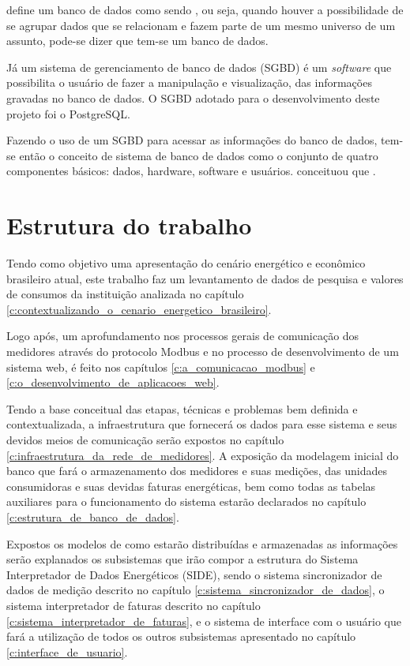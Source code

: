  define um banco de dados como sendo , ou seja, quando houver a possibilidade de se agrupar dados que se relacionam e fazem parte de um mesmo universo de um assunto, pode-se dizer que tem-se um banco de dados.

Já um sistema de gerenciamento de banco de dados (SGBD) é um \textit{software} que possibilita o usuário de fazer a manipulação e visualização, das informações gravadas no banco de dados. O SGBD adotado para o desenvolvimento deste projeto foi o PostgreSQL.

Fazendo o uso de um SGBD para acessar as informações do banco de dados, tem-se então o conceito de sistema de banco de dados como o conjunto de quatro componentes básicos: dados, hardware, software e usuários. \cite{date2004} conceituou que .


\section{Estrutura do trabalho}

Tendo como objetivo uma apresentação do cenário energético e econômico brasileiro atual, este trabalho faz um levantamento de dados de pesquisa e valores de consumos da instituição analizada no capítulo \ref{c:contextualizando_o_cenario_energetico_brasileiro}.

Logo após, um aprofundamento nos processos gerais de comunicação dos medidores através do protocolo Modbus e no processo de desenvolvimento de um sistema web, é feito nos capítulos \ref{c:a_comunicacao_modbus} e \ref{c:o_desenvolvimento_de_aplicacoes_web}.

Tendo a base conceitual das etapas, técnicas e problemas bem definida e contextualizada, a infraestrutura que fornecerá os dados para esse sistema e seus devidos meios de comunicação serão expostos no capítulo \ref{c:infraestrutura_da_rede_de_medidores}.
A exposição da modelagem inicial do banco que fará o armazenamento dos medidores e suas medições, das unidades consumidoras e suas devidas faturas energéticas, bem como todas as tabelas auxiliares para o funcionamento do sistema estarão declarados no capítulo \ref{c:estrutura_de_banco_de_dados}.

Expostos os modelos de como estarão distribuídas e armazenadas as informações serão explanados os subsistemas que irão compor a estrutura do Sistema Interpretador de Dados Energéticos (SIDE), sendo o sistema sincronizador de dados de medição descrito no capítulo \ref{c:sistema_sincronizador_de_dados}, o sistema interpretador de faturas descrito no capítulo \ref{c:sistema_interpretador_de_faturas}, e o sistema de interface com o usuário que fará a utilização de todos os outros subsistemas apresentado no capítulo \ref{c:interface_de_usuario}.

